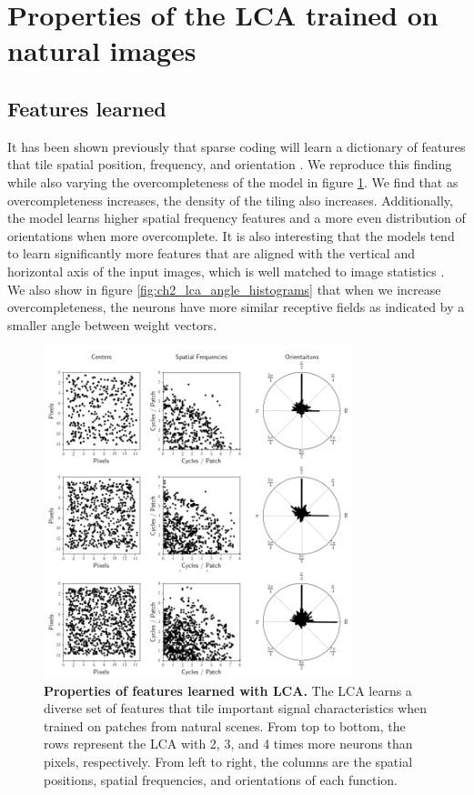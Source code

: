 \section{Properties of the LCA trained on natural images}\label{sec:ch2_lca_properties}
\subsection{Features learned}
It has been shown previously that sparse coding will learn a dictionary of features that tile spatial position, frequency, and orientation \parencite{olshausen1996emergence, olshausen1997sparse}. We reproduce this finding while also varying the overcompleteness of the model in figure \ref{fig:ch2_lca_overcompleteness_tiling}. We find that as overcompleteness increases, the density of the tiling also increases. Additionally, the model learns higher spatial frequency features and a more even distribution of orientations when more overcomplete. It is also interesting that the models tend to learn significantly more features that are aligned with the vertical and horizontal axis of the input images, which is well matched to image statistics \parencite{switkes1978spatial, torralba2003statistics}. We also show in figure \ref{fig:ch2_lca_angle_histograms} that when we increase overcompleteness, the neurons have more similar receptive fields as indicated by a smaller angle between weight vectors.

\begin{figure}[ht]
    \centering
    \includegraphics[width=0.8\textwidth]{figures/lca_overcompleteness_location_frequency_centers.png}
    \caption{\textbf{Properties of features learned with LCA.} The LCA learns a diverse set of features that tile important signal characteristics when trained on patches from natural scenes. From top to bottom, the rows represent the LCA with 2, 3, and 4 times more neurons than pixels, respectively. From left to right, the columns are the spatial positions, spatial frequencies, and orientations of each function.}
    \label{fig:ch2_lca_overcompleteness_tiling}
\end{figure}


